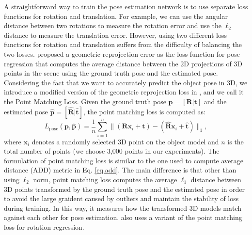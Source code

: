 \documentclass[twocolumn]{svjour3}
\newcommand{\yi}[1]{#1}
\begin{document}
A straightforward way to train the pose estimation network is to use separate loss functions for rotation and translation. For example, we can use the angular distance between two rotations to measure the rotation error and use the $\ell_2$ distance to measure the translation error. However, using two different loss functions for rotation and translation suffers from the difficulty of balancing the two losses. \citep{kendall2017geometric} proposed a geometric reprojection error as the loss function for pose regression that computes the average distance between the 2D projections of 3D points in the scene using the ground truth pose and the estimated pose.
Considering the fact that we want to accurately predict the object pose in 3D, we introduce a modified version of the geometric reprojection loss in \citep{kendall2017geometric}, and we call it the Point Matching Loss. Given the ground truth pose $\mathbf{p} = [\mathbf{R}|\mathbf{t}]$ and the estimated pose $\mathbf{\hat{p}}=[\mathbf{\hat{R}}|\mathbf{\hat{t}}]$, the point matching loss is computed as:
\begin{equation}
L_\text{pose}(\mathbf{p}, \mathbf{\hat{p}})
= \frac{1}{n} \sum_{i=1}^n \|(\mathbf{R}\mathbf{x}_i+ \mathbf{t}) - (\mathbf{\hat{R}}
\mathbf{x}_i+\mathbf{\hat{t}})\|_1,
\label{eq.reproj3d}
\end{equation}
where $\mathbf{x}_i$ denotes a randomly selected 3D point on the object model and $n$ is the total number of points (we choose 3,000 points in our experiments). \yi{The formulation of point matching loss is similar to the one used to compute average distance (ADD) metric in Eq. \ref{eq.add}. The main difference is that other than using $\ell_2$ norm, point matching loss computes the average $\ell_1$ distance between 3D points transformed by the ground truth pose and the estimated pose in order to avoid the large graident caused by outliers and maintain the stability of loss during training}. In this way, it measures how the transformed 3D models match against each other for pose estimation. \citep{xiang2017posecnn} also uses a variant of the point matching loss for rotation regression.

\end{document}

